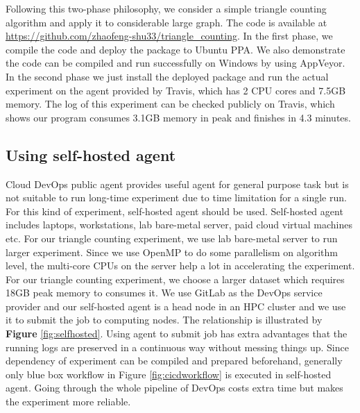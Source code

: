 \documentclass{IEEEcsmag}
\begin{document}
Following this two-phase philosophy, we consider a simple triangle counting algorithm and apply it to considerable large graph. The code is available at \url{https://github.com/zhaofeng-shu33/triangle_counting}.
In the first phase, we compile the code and deploy the package to Ubuntu PPA. We also demonstrate the code can be compiled and run successfully on Windows by using AppVeyor. In the second phase we just install the deployed package and run the actual experiment on the agent provided by Travis, which has 2 CPU cores and 7.5GB memory. The log of this experiment can be checked publicly on Travis, which shows
our program consumes 3.1GB memory in peak and finishes in 4.3 minutes. 

\subsection{Using self-hosted agent}
Cloud DevOps public agent provides useful agent for general purpose task but is not suitable to run long-time experiment due to time limitation for a single run. For this kind of experiment, self-hosted agent should be used. Self-hosted agent includes laptops, workstations, lab bare-metal server, paid cloud virtual machines etc.
For our triangle counting experiment, we use lab bare-metal server to run larger experiment. Since we use OpenMP to do some parallelism on algorithm level, the multi-core CPUs on the server help a lot in accelerating the experiment. For our triangle counting experiment, we choose a larger dataset which requires 18GB peak memory to consumes it. We use GitLab as the DevOps service provider and our self-hosted agent is a head node in an HPC cluster and we use it to submit the job to computing nodes.
The relationship is illustrated by {\bf Figure} \ref{fig:selfhosted}. Using agent to submit job has extra advantages that the running logs are preserved in a continuous way without messing things up. Since dependency of experiment can be compiled and prepared beforehand, generally only blue box workflow in Figure \ref{fig:cicdworkflow}
is executed in self-hosted agent. Going through the whole pipeline of DevOps costs extra time but makes the experiment more reliable.
\end{document}

